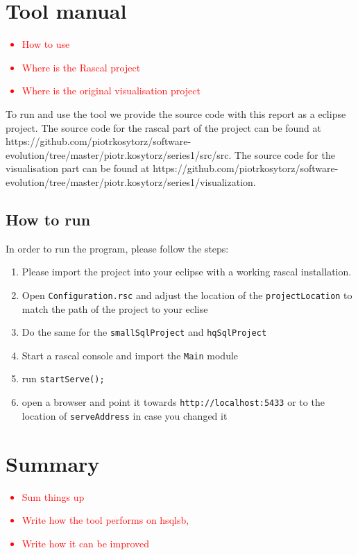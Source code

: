 \documentclass{uva-inf-article}
\newcommand\todo[1]{\textcolor{red}{#1}}
\begin{document}
\section{Tool manual}
\todo {
	\begin{itemize}
		\item{How to use}
		\item{Where is the Rascal project}
		\item{Where is the original visualisation project }
	\end{itemize}
}

To run and use the tool we provide the source code with this report as a eclipse project. The source code for the rascal part of the project can be found at https://github.com/piotrkosytorz/software-evolution/tree/master/piotr.kosytorz/series1/src/src. The source code for the visualisation part can be found at https://github.com/piotrkosytorz/software-evolution/tree/master/piotr.kosytorz/series1/visualization.

\subsection{How to run}

In order to run the program, please follow the steps:

\begin{enumerate}
\item
  Please import the project into your eclipse with a working rascal
  installation.
\item
  Open \texttt{Configuration.rsc} and adjust the location of the
  \texttt{projectLocation} to match the path of the project to your
  eclise
\item
  Do the same for the \texttt{smallSqlProject} and \texttt{hqSqlProject}
\item
  Start a rascal console and import the \texttt{Main} module
\item
  run \texttt{startServe();}
\item
  open a browser and point it towards \texttt{http://localhost:5433} or
  to the location of \texttt{serveAddress} in case you changed it
\end{enumerate}


\section{Summary}
\todo {
	\begin{itemize}
		\item{Sum things up}
		\item{Write how the tool performs on hsqlsb,}
		\item{Write how it can be improved}
	\end{itemize}
}
\end{document}
